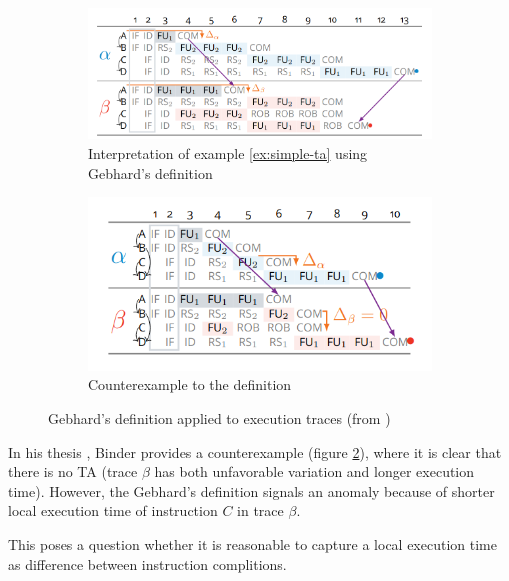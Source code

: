 \begin{figure}[!htb]
    \centering
    \begin{subfigure}[t]{0.5\textwidth}
        \centering
        \includegraphics[width=\textwidth]{figures/step-func-good.png}
        \caption{Interpretation of example \ref{ex:simple-ta} using Gebhard's definition}
        \label{fig:step-good}
    \end{subfigure}
    \hfill
    \begin{subfigure}[t]{0.49\textwidth}
        \centering
        \includegraphics[width=\textwidth]{figures/step-func-bad.png}
        \caption{Counterexample to the definition}
        \label{fig:step-bad}
    \end{subfigure}
    \caption{Gebhard's definition applied to execution traces (from \cite{binder_definitions_2022})}
    \label{fig:step}
\end{figure}

In his thesis \cite{binder_definitions_2022}, Binder provides a counterexample (figure \ref{fig:step-bad}), where it is clear that there is no TA (trace $\beta$ has both unfavorable variation and longer execution time). However, the Gebhard's definition signals an anomaly because of shorter local execution time of instruction $C$ in trace $\beta$.

This poses a question whether it is reasonable to capture a local execution time as difference between instruction complitions. 

